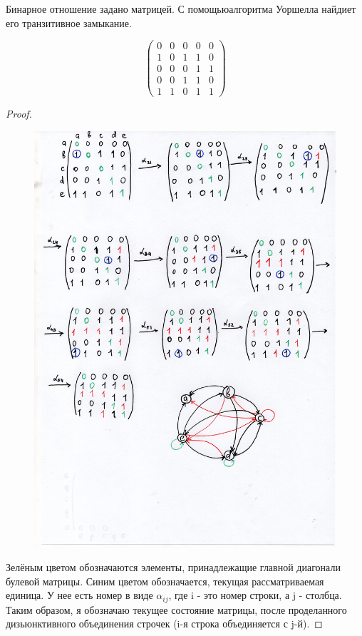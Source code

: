 
\renewcommand*{\proofname}{Решение}

\begin{problem}[1]
	Бинарное отношение задано матрицей. С помощьюалгоритма Уоршелла найдиет его транзитивное замыкание.
    \par

    \[\begin{pmatrix}
        0 & 0 & 0 & 0 & 0\\
        1 & 0 & 1 & 1 & 0\\
        0 & 0 & 0 & 1 & 1\\
        0 & 0 & 1 & 1 & 0\\
        1 & 1 & 0 & 1 & 1
    \end{pmatrix}\]
    
\end{problem}

\begin{proof}

    \begin{figure}[h]
     \includegraphics[width=0.634\linewidth]{pics/1thsolution.jpg}
     \label{fig:dm}
    \end{figure}

 Зелёным цветом обозначаются элементы, принадлежащие главной диагонали булевой матрицы. Синим цветом обозначается, текущая рассматриваемая единица. У нее есть номер в виде $\alpha_{ij}$, где i - это номер строки, а j - столбца. Таким образом, я обозначаю текущее состояние матрицы, после проделанного дизьюнктивного объединения строчек (i-я строка объединяется с j-й).
 
\end{proof}

